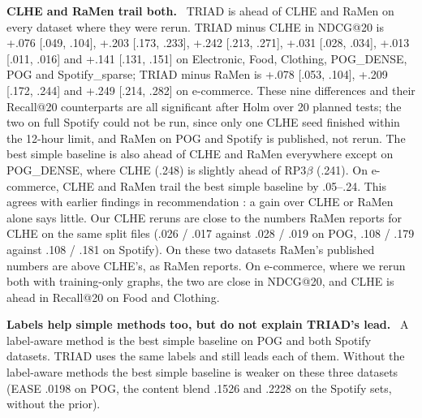 \documentclass[runningheads]{llncs}
\renewcommand{\paragraph}[1]{\smallskip\noindent\textbf{#1}\ }
\begin{document}
\paragraph{CLHE and RaMen trail both.} TRIAD is ahead of CLHE and RaMen on every dataset where they were rerun.
TRIAD minus CLHE in NDCG@20 is +.076 [.049, .104], +.203 [.173, .233], +.242 [.213, .271], +.031 [.028, .034],
+.013 [.011, .016] and +.141 [.131, .151] on Electronic, Food, Clothing, POG\_DENSE, POG and Spotify\_sparse; TRIAD
minus RaMen is +.078 [.053, .104], +.209 [.172, .244] and +.249 [.214, .282] on e-commerce. These nine differences and their
Recall@20 counterparts are all significant after Holm over 20 planned tests; the two on full Spotify could not be run,
since only one CLHE seed finished within the 12-hour limit, and RaMen on POG and Spotify is published, not rerun. The
best simple baseline is also ahead of CLHE and RaMen everywhere except on POG\_DENSE, where CLHE (.248) is slightly
ahead of RP3$\beta$ (.241). On e-commerce, CLHE and RaMen trail the best simple baseline by
.05--.24. This agrees with earlier findings in recommendation \cite{dacrema}: a gain over CLHE or RaMen alone says
little. Our CLHE reruns are close to the numbers RaMen reports for CLHE on the same split files (.026 / .017
against .028 / .019 on POG, .108 / .179 against .108 / .181 on Spotify). On these two datasets RaMen's published
numbers are above CLHE's, as RaMen reports. On e-commerce, where we rerun both with training-only graphs, the two are
close in NDCG@20, and CLHE is ahead in Recall@20 on Food and Clothing.

\paragraph{Labels help simple methods too, but do not explain TRIAD's lead.} A label-aware method is the best simple
baseline on POG and both Spotify datasets. TRIAD uses the same labels and still leads each of them. Without the
label-aware methods the best simple baseline is weaker on these three datasets (EASE .0198 on POG, the content blend
.1526 and .2228 on the Spotify sets, without the prior).
\end{document}
